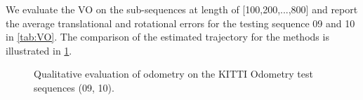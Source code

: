   We evaluate the VO on the sub-sequences at length of [100,200,...,800] and report the average translational and rotational errors for the testing sequence 09 and 10 in \cref{tab:VO}.  The comparison of the estimated trajectory for the methods is illustrated in \cref{fig:VO}.


  \begin{figure}[t]
    \centering  
    \caption{Qualitative evaluation of odometry on the KITTI Odometry test sequences (09, 10).}
    \label{fig:VO}
  \end{figure}


